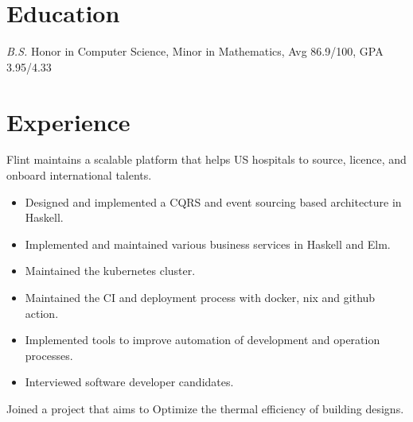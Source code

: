 \documentclass{resume}
\begin{document}


\section{Education}
\textit{B.S.} Honor in Computer Science, Minor in Mathematics, Avg 86.9/100, GPA 3.95/4.33

\section{Experience}
    Flint maintains a scalable platform that helps US hospitals to source, licence, and onboard international talents.

    \begin{itemize}
        \item Designed and implemented a CQRS and event sourcing based architecture in Haskell.

        \item Implemented and maintained various business services in Haskell and Elm. 

        \item Maintained the kubernetes cluster.

        \item Maintained the CI and deployment process with docker, nix and github action.

        \item Implemented tools to improve automation of development and operation processes. 

        \item Interviewed software developer candidates.
    \end{itemize}

     \vspace{-0.1in}

    Joined a project that aims to Optimize the thermal efficiency of building designs.
\end{document}
